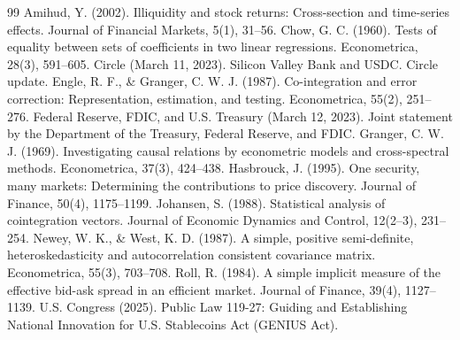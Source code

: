 \documentclass[12pt,twocolumn]{article}
\begin{document}
\small
\begin{thebibliography}{99}
 Amihud, Y. (2002). Illiquidity and stock returns: Cross-section and time-series effects. {Journal of Financial Markets}, 5(1), 31--56.
 Chow, G. C. (1960). Tests of equality between sets of coefficients in two linear regressions. {Econometrica}, 28(3), 591--605.
 Circle (March 11, 2023). {Silicon Valley Bank and USDC}. Circle update.
 Engle, R. F., \& Granger, C. W. J. (1987). Co-integration and error correction: Representation, estimation, and testing. {Econometrica}, 55(2), 251--276.
 Federal Reserve, FDIC, and U.S. Treasury (March 12, 2023). {Joint statement by the Department of the Treasury, Federal Reserve, and FDIC}.
 Granger, C. W. J. (1969). Investigating causal relations by econometric models and cross-spectral methods. {Econometrica}, 37(3), 424--438.
 Hasbrouck, J. (1995). One security, many markets: Determining the contributions to price discovery. {Journal of Finance}, 50(4), 1175--1199.
 Johansen, S. (1988). Statistical analysis of cointegration vectors. {Journal of Economic Dynamics and Control}, 12(2--3), 231--254.
 Newey, W. K., \& West, K. D. (1987). A simple, positive semi-definite, heteroskedasticity and autocorrelation consistent covariance matrix. {Econometrica}, 55(3), 703--708.
 Roll, R. (1984). A simple implicit measure of the effective bid-ask spread in an efficient market. {Journal of Finance}, 39(4), 1127--1139.
 U.S. Congress (2025). {Public Law 119-27: Guiding and Establishing National Innovation for U.S. Stablecoins Act (GENIUS Act)}.
\end{thebibliography}
\end{document}
